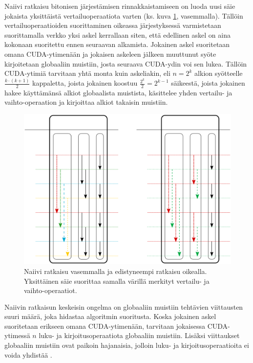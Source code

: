 \documentclass[a4paper,11pt]{article}
\begin{document}
Naiivi ratkaisu bitonisen järjestämisen rinnakkaistamiseen on luoda uusi säie jokaista yksittäistä vertailuoperaatiota varten (ks. kuva \ref{fig:bitonic_divided}, vasemmalla). Tällöin vertailuoperaatioiden suorittaminen oikeassa järjestyksessä varmistetaan suorittamalla verkko yksi askel kerrallaan siten, että edellinen askel on aina kokonaan suoritettu ennen seuraavan alkamista. Jokainen askel suoritetaan omana CUDA-ytimenään ja jokaisen askeleen jälkeen muuttunut syöte kirjoitetaan globaaliin muistiin, josta seuraava CUDA-ydin voi sen lukea. Tällöin CUDA-ytimiä tarvitaan yhtä monta kuin askeliakin, eli $n = 2^k$ alkion syötteelle $\frac{k \cdot (k + 1)}{2}$ kappaletta, joista jokainen koostuu $\frac{2^k}{2} = 2^{k-1}$ säikeestä, joista jokainen hakee käyttämänsä alkiot globaalista muistista, käsittelee yhden vertailu- ja vaihto-operaation ja kirjoittaa alkiot takaisin muistiin.

\begin{figure}
\centering
\includegraphics[scale = 0.8]{bitonic_divided}
\caption{Naiivi ratkaisu vasemmalla ja edistyneempi ratkaisu oikealla. Yksittäinen säie suorittaa samalla värillä merkityt vertailu- ja vaihto-operaatiot.}
\label{fig:bitonic_divided}
\end{figure}

Naiivin ratkaisun keskeisin ongelma on globaaliin muistiin tehtävien viittausten suuri määrä, joka hidastaa algoritmin suoritusta. Koska jokainen askel suoritetaan erikseen omana CUDA-ytimenään, tarvitaan jokaisessa CUDA-ytimessä $n$ luku- ja kirjoitusoperaatiota globaaliin muistiin. Lisäksi viittaukset globaaliin muistiin ovat paikoin hajanaisia, jolloin luku- ja kirjoitusoperaatioita ei voida yhdistää \cite{peters2012gems}.
\end{document}
